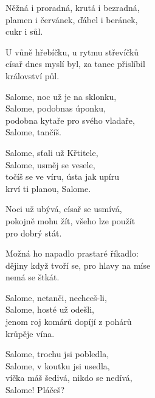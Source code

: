 
\ve{}
Něžná i proradná, krutá i bezradná,\\
plamen i červánek, ďábel i beránek,\\
cukr i sůl.

U vůně hřebíčku, u rytmu střevíčků\\
císař dnes myslí byl, za tanec přislíbil\\
království půl.

\cho{}
Salome, noc už je na sklonku,\\
Salome, podobnas úponku,\\
podobna kytaře pro svého vladaře,\\
Salome, tančíš.

\cho{}
Salome, sťali už Křtitele,\\
Salome, usměj se vesele,\\
točíš se ve víru, ústa jak upíru\\
krví ti planou, Salome.

\ve{}
Noci už ubývá, císař se usmívá,\\
pokojně mohu žít, všeho lze použít\\
pro dobrý stát.

Možná ho napadlo prastaré říkadlo:\\
dějiny když tvoří se, pro hlavy na míse\\
nemá se štkát.
\vspace{-2pt}

\cho{}
Salome, netanči, nechceš-li,\\
Salome, hosté už odešli,\\
jenom roj komárů dopíjí z pohárů\\
krůpěje vína.
\vspace{-2pt}

\cho{}
Salome, trochu jsi pobledla,\\
Salome, v koutku jsi usedla,\\
víčka máš šedivá, nikdo se nedívá,\\                    
Salome! Pláčeš?


\esong{}
